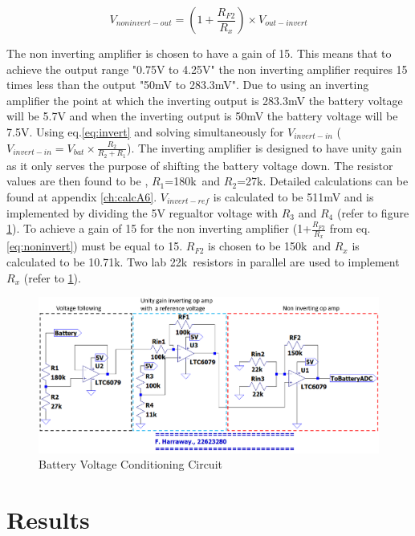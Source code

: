 \begin{equation}
V_{non invert-out}= (1+\frac{R_{F2}}{R_{x}})\times V_{out-invert}
    \label{eq:noninvert}
\end{equation}

The non inverting amplifier is chosen to have a gain of 15. This means that to achieve the output range "0.75V to 4.25V" the non inverting amplifier requires 15 times less than the output "50mV to 283.3mV". Due to using an inverting amplifier the point at which the inverting output is 283.3mV the battery voltage will be 5.7V and when the inverting output is 50mV the battery voltage will be 7.5V. Using eq.\ref{eq:invert} and solving simultaneously for $V_{invert-in}$ ($V_{invert-in}=V_{bat}\times\frac{R_2}{R_2+R_1}$). The inverting amplifier is designed to have unity gain as it only serves the purpose of shifting the battery voltage down. The resistor values are then found to be , $R_1$=180k\textohm \ and $R_2$=27k\textohm. Detailed calculations can be found at appendix \ref{ch:calcA6}. $V_{invert-ref}$ is calculated to be 511mV and is implemented by dividing the 5V regualtor voltage with $R_3$ and $R_4$ (refer to figure \ref{fig:batcond}). 
\newline \newline
To achieve a gain of 15 for the non inverting amplifier (1+$\frac{R_{F2}}{R_{x}}$ from eq.\ref{eq:noninvert}) must be equal to 15. $R_{F2}$ is chosen to be 150k\textohm \ and $R_x$ is calculated to be 10.71k\textohm. Two lab 22k\textohm \ resistors in parallel are used to implement $R_x$ (refer to \ref{fig:batcond}).



\begin{figure}[!htb]
\centering
\includegraphics[scale=0.3]{Figures/A6circ1.PNG}
\caption{Battery Voltage Conditioning Circuit}
\label{fig:batcond}
\end{figure}








\section{Results}\label{sec:loadcontrol_results}

\vfill

